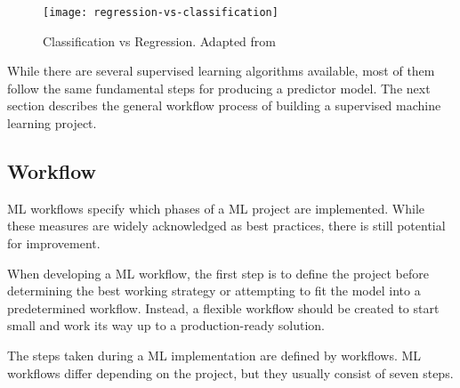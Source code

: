 \begin{figure}[htbp]
    \centering
    \texttt{[image: regression-vs-classification]}
    \caption{Classification vs Regression. Adapted from~\cite{Matanga2017AnalysisInterfaces}}
    \label{fig:regression_vs_classification}
\end{figure}


While there are several supervised learning algorithms available, most of them follow the same fundamental steps for producing a predictor model. The next section describes the general workflow process of building a supervised machine learning project.

\subsection{Workflow}\label{sec:workflow}

\gls{ML} workflows specify which phases of a \gls{ML} project are implemented. While these measures are widely acknowledged as best practices, there is still potential for improvement. 

When developing a \gls{ML} workflow, the first step is to define the project before determining the best working strategy or attempting to fit the model into a predetermined workflow. Instead, a flexible workflow should be created to start small and work its way up to a production-ready solution.

The steps taken during a \gls{ML} implementation are defined by workflows. \gls{ML} workflows differ depending on the project, but they usually consist of seven steps.


